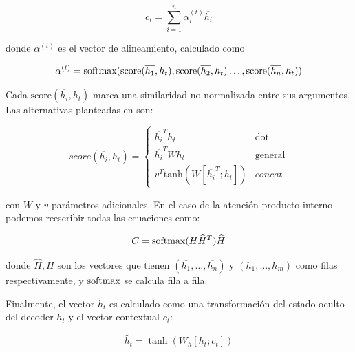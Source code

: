 \begin{equation*}
    c_t = \sum_{i=1}^n \alpha_i^{(t)} \overline{h_i}
\end{equation*}

\noindent donde $\alpha^{(t)}$ es el vector de alineamiento, calculado como

\newcommand{\score}[0]{\text{score}}

\begin{equation*}
    \alpha^{(t)} = \softmax(\score(\overline{h_1}, h_t), \score(\overline{h_2}, h_t) \ldots , \score(\overline{h_n}, h_t))
\end{equation*}

\noindent Cada $\score(\overline{h_i}, h_t)$ marca una similaridad no normalizada entre sus argumentos. Las alternativas planteadas en \citet{luong2015effective} son:

\begin{equation}
    score(\overline{h_i}, h_t) =  \begin{cases}
        \overline{h_i}^T h_t   & \text{dot} \\
        \overline{h_i}^T W h_t & \text{general} \\
        v^T\text{tanh}(W [\overline{h_i}^T; h_t]) & concat
     \end{cases}
\end{equation}

%

\noindent con $W$ y $v$ parámetros adicionales. En el caso de la atención producto interno podemos reescribir todas las ecuaciones como:

\begin{equation}
    C = \text{softmax}(H \widehat{H}^T ) \widehat{H}
    \label{eq:attention_product}
\end{equation}

\noindent donde $\widehat{H}, H$ son los vectores que tienen $(\overline{h_1}, \ldots , \overline{h_n})$  y $(h_1, \ldots , h_m)$ como filas respectivamente, y $\text{softmax}$ se calcula fila a fila.

Finalmente, el vector $\widetilde{h_t}$ es calculado como una transformación del estado oculto del decoder $h_t$ y el vector contextual $c_t$:


\begin{equation*}
    \widetilde{h_t} = \tanh(W_h [h_t; c_t])
\end{equation*}



